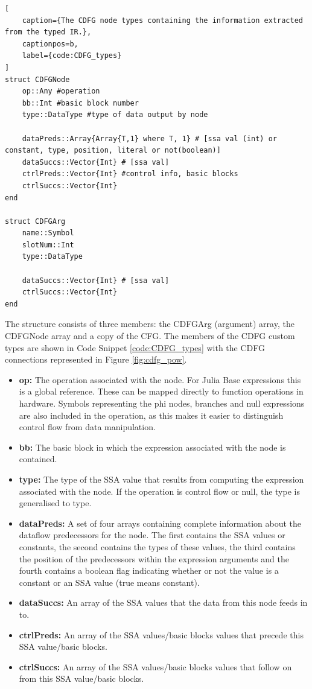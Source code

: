 \pagebreak

\begin{lstlisting}[
    caption={The CDFG node types containing the information extracted from the typed IR.},
    captionpos=b, 
    label={code:CDFG_types}
]
struct CDFGNode
    op::Any #operation
    bb::Int #basic block number
    type::DataType #type of data output by node

    dataPreds::Array{Array{T,1} where T, 1} # [ssa val (int) or constant, type, position, literal or not(boolean)]
    dataSuccs::Vector{Int} # [ssa val]
    ctrlPreds::Vector{Int} #control info, basic blocks
    ctrlSuccs::Vector{Int}
end

struct CDFGArg
    name::Symbol
    slotNum::Int
    type::DataType

    dataSuccs::Vector{Int} # [ssa val]
    ctrlSuccs::Vector{Int} 
end
\end{lstlisting}

The structure consists of three members: the CDFGArg (argument) array, the CDFGNode array and a copy of the CFG. The members of the CDFG custom types are shown in Code Snippet \ref{code:CDFG_types} with the CDFG connections represented in Figure \ref{fig:cdfg_pow}.

\begin{itemize}
	\item \textbf{op:} The operation associated with the node. For Julia Base expressions this is a global reference. These can be mapped directly to function operations in hardware. Symbols representing the phi nodes, branches and null expressions are also included in the operation, as this makes it easier to distinguish control flow from data manipulation.
	\item \textbf{bb:} The basic block in which the expression associated with the node is contained.
	\item \textbf{type:} The type of the SSA value that results from computing the expression associated with the node. If the operation is control flow or null, the type is generalised to  type.
	\item \textbf{dataPreds:} A set of four arrays containing complete information about the dataflow predecessors for the node. The first contains the SSA values or constants, the second contains the types of these values, the third contains the position of the predecessors within the expression arguments and the fourth contains a boolean flag indicating whether or not the value is a constant or an SSA value (true means constant).
	\item \textbf{dataSuccs:} An array of the SSA values that the data from this node feeds in to.
	\item \textbf{ctrlPreds:} An array of the SSA values/basic blocks values that precede this SSA value/basic blocks.
	\item \textbf{ctrlSuccs:} An array of the SSA values/basic blocks values that follow on from this SSA value/basic blocks.
\end{itemize}

